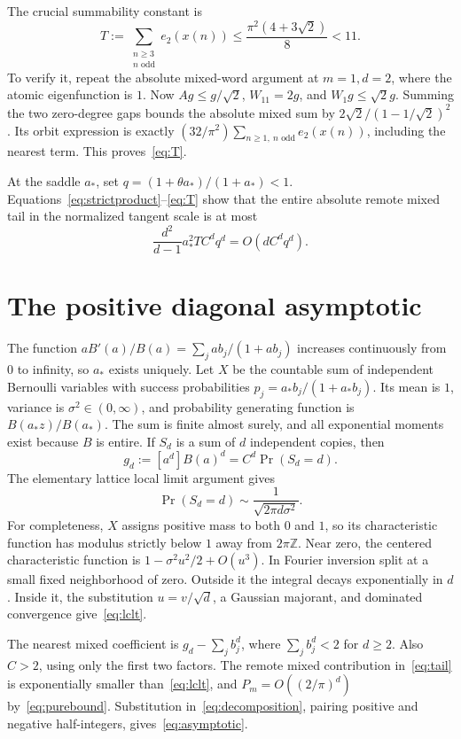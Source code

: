 \documentclass[11pt,a4paper]{article}
\theoremstyle{remark}\newtheorem*{ednote}{Editorial note (ProveIt, 2026-10-01)}
\newcommand{\Z}{\mathbb Z}\newcommand{\ii}{\mathrm i}\newcommand{\ev}{\operatorname{ev}}
\begin{document}
The crucial summability constant is
\begin{equation}\label{eq:T}
 T:=\sum_{\substack{n\ge3\\n\text{ odd}}}e_2(x(n))
 \le\frac{\pi^2(4+3\sqrt2)}8<11.
\end{equation}
To verify it, repeat the absolute mixed-word argument at $m=1,d=2$, where the atomic eigenfunction is $1$. Now $Ag\le g/\sqrt2$, $W_11=2g$, and $W_1g\le\sqrt2g$. Summing the two zero-degree gaps bounds the absolute mixed sum by $2\sqrt2/(1-1/\sqrt2)^2$. Its orbit expression is exactly $(32/\pi^2)\sum_{n\ge1,\ n\text{ odd}}e_2(x(n))$, including the nearest term. This proves~\eqref{eq:T}.

At the saddle $a_*$, set $q=(1+\theta a_*)/(1+a_*)<1$. Equations~\eqref{eq:strictproduct}--\eqref{eq:T} show that the entire absolute remote mixed tail in the normalized tangent scale is at most
\begin{equation}\label{eq:tail}
 \frac{d^2}{d-1}a_*^2T C^dq^d=O(dC^dq^d).
\end{equation}

\section{The positive diagonal asymptotic}
The function $aB'(a)/B(a)=\sum_jab_j/(1+ab_j)$ increases continuously from $0$ to infinity, so $a_*$ exists uniquely. Let $X$ be the countable sum of independent Bernoulli variables with success probabilities $p_j=a_*b_j/(1+a_*b_j)$. Its mean is $1$, variance is $\sigma^2\in(0,\infty)$, and probability generating function is $B(a_*z)/B(a_*)$. The sum is finite almost surely, and all exponential moments exist because $B$ is entire. If $S_d$ is a sum of $d$ independent copies, then
\[
 g_d:=[a^d]B(a)^d=C^d\Pr(S_d=d).
\]
The elementary lattice local limit argument gives
\begin{equation}\label{eq:lclt}
 \Pr(S_d=d)\sim\frac1{\sqrt{2\pi d\sigma^2}}.
\end{equation}
For completeness, $X$ assigns positive mass to both $0$ and $1$, so its characteristic function has modulus strictly below $1$ away from $2\pi\Z$. Near zero, the centered characteristic function is $1-\sigma^2u^2/2+O(u^3)$. In Fourier inversion split at a small fixed neighborhood of zero. Outside it the integral decays exponentially in $d$. Inside it, the substitution $u=v/\sqrt d$, a Gaussian majorant, and dominated convergence give~\eqref{eq:lclt}.

The nearest mixed coefficient is $g_d-\sum_jb_j^d$, where $\sum_jb_j^d<2$ for $d\ge2$. Also $C>2$, using only the first two factors. The remote mixed contribution in~\eqref{eq:tail} is exponentially smaller than~\eqref{eq:lclt}, and $P_m=O((2/\pi)^d)$ by~\eqref{eq:purebound}. Substitution in~\eqref{eq:decomposition}, pairing positive and negative half-integers, gives~\eqref{eq:asymptotic}.
\end{document}
